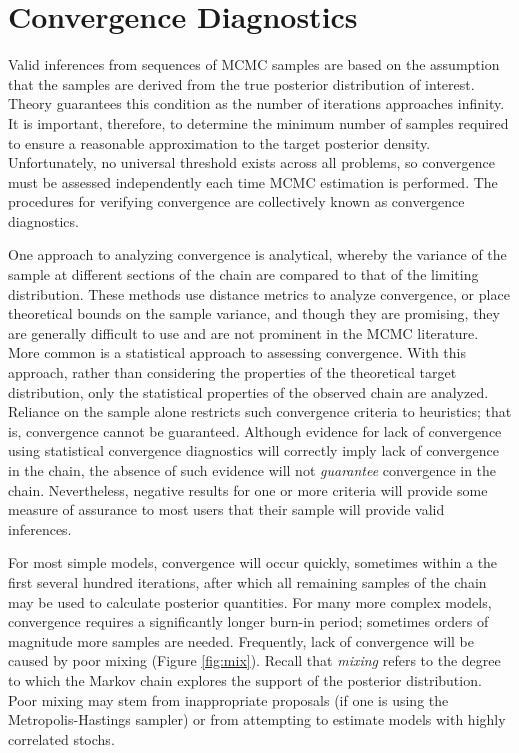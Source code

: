 \hypertarget{convergence}{}
\section*{Convergence Diagnostics} %

Valid inferences from sequences of MCMC samples are based on the assumption that the samples are derived from the true posterior distribution of interest. Theory guarantees this condition as the number of iterations approaches infinity. It is important, therefore, to determine the minimum number of samples required to ensure a reasonable approximation to the target posterior density. Unfortunately, no universal threshold exists across all problems, so convergence must be assessed independently each time MCMC estimation is performed. The procedures for verifying convergence are collectively known as convergence diagnostics.

One approach to analyzing convergence is analytical, whereby the variance of the sample at different sections of the chain are compared to that of the limiting distribution. These methods use distance metrics to analyze convergence, or place theoretical bounds on the sample variance, and though they are promising, they are generally difficult to use and are not prominent in the MCMC literature. More common is a statistical approach to assessing convergence. With this approach, rather than considering the properties of the theoretical target distribution, only the statistical properties of the observed chain are analyzed. Reliance on the sample alone restricts such convergence criteria to heuristics; that is, convergence cannot be guaranteed. Although evidence for lack of convergence using statistical convergence diagnostics will correctly imply lack of convergence in the chain, the absence of such evidence will not \emph{guarantee} convergence in the chain. Nevertheless, negative results for one or more criteria will provide some measure of assurance to most users that their sample will provide valid inferences.

For most simple models, convergence will occur quickly, sometimes within a the first several hundred iterations, after which all remaining samples of the chain may be used to calculate posterior quantities. For many more complex models, convergence requires a significantly longer burn-in period; sometimes  orders of magnitude more samples are needed. Frequently, lack of convergence will be caused by poor mixing (Figure \ref{fig:mix}). Recall that \emph{mixing} refers to the degree to which the Markov chain explores the support of the posterior distribution. Poor mixing may stem from inappropriate proposals (if one is using the Metropolis-Hastings sampler) or from attempting to estimate models with highly correlated stochs.

